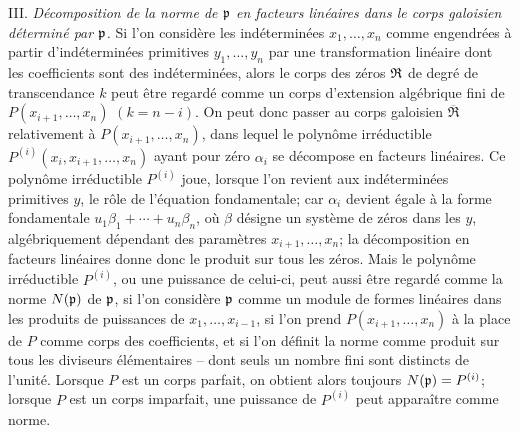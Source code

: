 III. \emph{Décomposition de la norme de $\mathfrak p$ en facteurs linéaires dans le corps galoisien déterminé par $\mathfrak p$.} Si l'on considère les indéterminées $x_1,\ldots,x_n$ comme engendrées à partir d'indéterminées primitives $y_1,\ldots,y_n$ par une transformation linéaire dont les coefficients sont des indéterminées, alors le corps des zéros $\mathfrak R$ de degré de transcendance $k$ peut être regardé comme un corps d'extension algébrique fini de $P(x_{i+1},\ldots,x_n)$ $(k=n-i)$. On peut donc passer au corps galoisien $\overline{\mathfrak R}$ relativement à $P(x_{i+1},\ldots,x_n)$, dans lequel le polynôme irréductible $P^{(i)}(x_i,x_{i+1},\ldots,x_n)$ ayant pour zéro $\alpha_i$ se décompose en facteurs linéaires. Ce polynôme irréductible $P^{(i)}$ joue, lorsque l'on revient aux indéterminées primitives $y$, le rôle de l'équation fondamentale; car $\alpha_i$ devient égale à la forme fondamentale $u_1\beta_1+\cdots+u_n\beta_n$, où $\beta$ désigne un système de zéros dans les $y$, algébriquement dépendant des paramètres $x_{i+1},\ldots,x_n$; la décomposition en facteurs linéaires donne donc le produit sur tous les zéros. Mais le polynôme irréductible $P^{(i)}$, ou une puissance de celui-ci, peut aussi être regardé comme la norme $N(\mathfrak p)$ de $\mathfrak p$, si l'on considère $\mathfrak p$ comme un module de formes linéaires dans les produits de puissances de $x_1,\ldots,x_{i-1}$, si l'on prend $P(x_{i+1},\ldots,x_n)$ à la place de $P$ comme corps des coefficients, et si l'on définit la norme comme produit sur tous les diviseurs élémentaires -- dont seuls un nombre fini sont distincts de l'unité. Lorsque $P$ est un corps parfait, on obtient alors toujours $N(\mathfrak p)=P^{(i)}$; lorsque $P$ est un corps imparfait, une puissance de $P^{(i)}$ peut apparaître comme norme.

